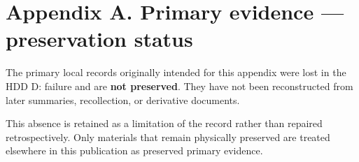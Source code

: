 ﻿%
%

\section*{Appendix A. Primary evidence — preservation status}
\label{sec:appendix-a}

The primary local records originally intended for this appendix were lost in
the HDD D: failure and are \textbf{not preserved}. They have not been
reconstructed from later summaries, recollection, or derivative documents.

This absence is retained as a limitation of the record rather than repaired
retrospectively. Only materials that remain physically preserved are treated
elsewhere in this publication as preserved primary evidence.

